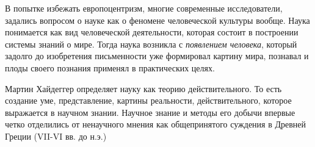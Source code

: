 В попытке избежать европоцентризм, многие современные исследователи, задались
вопросом о науке как о феномене человеческой культуры вообще. Наука понимается как вид человеческой деятельности, которая состоит в построении системы знаний о мире. Тогда наука возникла с \textit{появлением человека}, который задолго до изобретения письменности уже
формировал картину мира, познавал и плоды своего познания применял в практических целях.



Мартин Хайдеггер определяет науку как теорию действительного. То
есть создание уме, представление, картины реальности, действительного, которое
выражается в научном знании.  Научное знание и методы его добычи впервые четко отделились от ненаучного
мнения как общепринятого суждения в Древней Греции (VII-VI вв. до н.э.)

